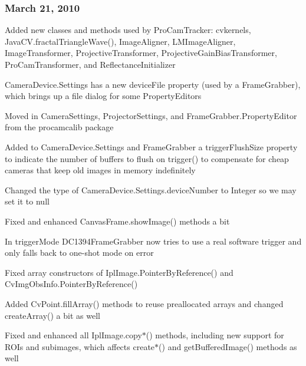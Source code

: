 \subsubsection*{March 21, 2010}


\begin{DoxyItemize}
\item Added new classes and methods used by Pro\+Cam\+Tracker\+: {\ttfamily cvkernels}, {\ttfamily Java\+C\+V.\+fractal\+Triangle\+Wave()}, {\ttfamily Image\+Aligner}, {\ttfamily L\+M\+Image\+Aligner}, {\ttfamily Image\+Transformer}, {\ttfamily Projective\+Transformer}, {\ttfamily Projective\+Gain\+Bias\+Transformer}, {\ttfamily Pro\+Cam\+Transformer}, and {\ttfamily Reflectance\+Initializer}
\item {\ttfamily Camera\+Device.\+Settings} has a new {\ttfamily device\+File} property (used by a {\ttfamily Frame\+Grabber}), which brings up a file dialog for some {\ttfamily Property\+Editor}s
\item Moved in {\ttfamily Camera\+Settings}, {\ttfamily Projector\+Settings}, and {\ttfamily Frame\+Grabber.\+Property\+Editor} from the {\ttfamily procamcalib} package
\item Added to {\ttfamily Camera\+Device.\+Settings} and {\ttfamily Frame\+Grabber} a {\ttfamily trigger\+Flush\+Size} property to indicate the number of buffers to flush on {\ttfamily trigger()} to compensate for cheap cameras that keep old images in memory indefinitely
\item Changed the type of {\ttfamily Camera\+Device.\+Settings.\+device\+Number} to {\ttfamily Integer} so we may set it to {\ttfamily null}
\item Fixed and enhanced {\ttfamily Canvas\+Frame.\+show\+Image()} methods a bit
\item In {\ttfamily trigger\+Mode} {\ttfamily D\+C1394\+Frame\+Grabber} now tries to use a real software trigger and only falls back to one-\/shot mode on error
\item Fixed array constructors of {\ttfamily Ipl\+Image.\+Pointer\+By\+Reference()} and {\ttfamily Cv\+Img\+Obs\+Info.\+Pointer\+By\+Reference()}
\item Added {\ttfamily Cv\+Point.\+fill\+Array()} methods to reuse preallocated arrays and changed {\ttfamily create\+Array()} a bit as well
\item Fixed and enhanced all {\ttfamily Ipl\+Image.\+copy$\ast$()} methods, including new support for R\+O\+Is and subimages, which affects {\ttfamily create$\ast$()} and {\ttfamily get\+Buffered\+Image()} methods as well

\end{DoxyItemize}
